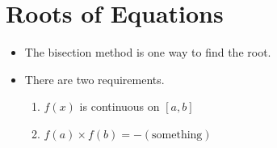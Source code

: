\documentclass[12pt]{article}
\begin{document}
\section{Roots of Equations}

\begin{itemize}
    \item The bisection method is one way to find the root.
    \item There are two requirements.
    \begin{enumerate}
        \item $f(x)$ is continuous on $[a, b]$
        \item $f(a) \times f(b) = -(\text{something})$
    \end{enumerate}
\end{itemize}
\end{document}
